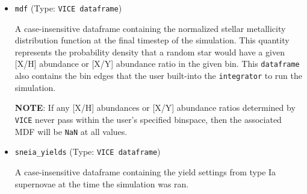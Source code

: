 \documentclass{report}
\begin{document}
\begin{itemize}
	\item{ %
		\texttt{mdf} (Type: \texttt{VICE dataframe}) 
		\par
		A case-insensitive dataframe containing the normalized stellar 
		metallicity distribution function at the final timestep of the 
		simulation. This quantity represents the probability density that a 
		random star would have a given [X/H] abundance or [X/Y] abundance 
		ratio in the given bin. This \texttt{dataframe} also contains the 
		bin edges that the user built-into the \texttt{integrator} to run 
		the simulation. 
		\par
		\textbf{NOTE}: If any [X/H] abundances or [X/Y] abundance ratios 
		determined by \texttt{VICE} never pass within the user's specified 
		binspace, then the associated MDF will be \texttt{NaN} at all values. 
	}

	\item{ %
		\texttt{sneia\_yields} (Type: \texttt{VICE dataframe}) 
		\par
		A case-insensitive dataframe containing the yield settings from 
		type Ia supernovae at the time the simulation was ran. 
	}
\end{itemize}
\end{document}
